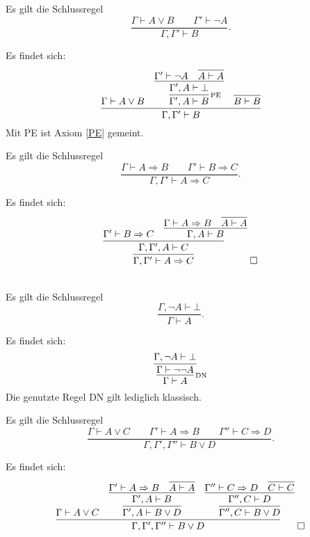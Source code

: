 \begin{Satz}
Es gilt die Schlussregel
\[\dfrac{\Gamma\vdash A\lor B\qquad\Gamma'\vdash \neg A}{\Gamma,\Gamma'\vdash B}.\]
\end{Satz}
\begin{Beweis}
Es findet sich:
\[\infer{\Gamma,\Gamma'\vdash B}{
  \Gamma\vdash A\lor B
  & \infer[\infernote{PE}]{\Gamma',A\vdash B}{
      \infer{\Gamma',A\vdash\bot}{
        \Gamma'\vdash\neg A & \infer{A\vdash A}{}}}
  & \infer{B\vdash B}{}}\]
Mit PE ist Axiom \ref{PE} gemeint.\,\qedsymbol
\end{Beweis}

\begin{Satz}[Kettenschluss]
Es gilt die Schlussregel
\[\dfrac{\Gamma\vdash A\Rightarrow B\qquad\Gamma'\vdash B\Rightarrow C}
{\Gamma,\Gamma'\vdash A\Rightarrow C}.\]
\end{Satz}
\begin{Beweis} Es findet sich:
\[\infer{\Gamma,\Gamma'\vdash A\Rightarrow C}{
  \infer{\Gamma,\Gamma',A\vdash C}{
    \Gamma'\vdash B\Rightarrow C &
      \infer{\Gamma,A\vdash B}{
        \Gamma\vdash A\Rightarrow B
        & \infer{A\vdash A}{}}}}\;\qedsymbol
\]
\end{Beweis}

\begin{Satz}%
 \strong{[LEM]}\\
Es gilt die Schlussregel
\[\dfrac{\Gamma,\neg A\vdash\bot}{\Gamma\vdash A}.\]
\end{Satz}
\begin{Beweis} Es findet sich:
\[\infer[\infernote{DN}]{\Gamma\vdash A}{
  \infer{\Gamma\vdash\neg\neg A}{
    \Gamma,\neg A\vdash\bot}}
\]
Die genutzte Regel DN gilt lediglich klassisch.\,\qedsymbol
\end{Beweis}

\begin{Satz}\label{destructive-dilemma}
Es gilt die Schlussregel
\[\dfrac{\Gamma\vdash A\lor C\qquad
\Gamma'\vdash A\Rightarrow B\qquad\Gamma''\vdash C\Rightarrow D}{
\Gamma,\Gamma',\Gamma''\vdash B\lor D}.\]
\end{Satz}
\begin{Beweis}
Es findet sich:
\[\infer{\Gamma,\Gamma',\Gamma''\vdash B\lor D}{
  \Gamma\vdash A\lor C
  & \infer{\Gamma',A\vdash B\lor D}{
      \infer{\Gamma',A\vdash B}{
        \Gamma'\vdash A\Rightarrow B
        & \infer{A\vdash A}{}}}
  & \infer{\Gamma'',C\vdash B\lor D}{
      \infer{\Gamma'',C\vdash D}{
        \Gamma''\vdash C\Rightarrow D
        & \infer{C\vdash C}{}}}}\;\qedsymbol
\]
\end{Beweis}

